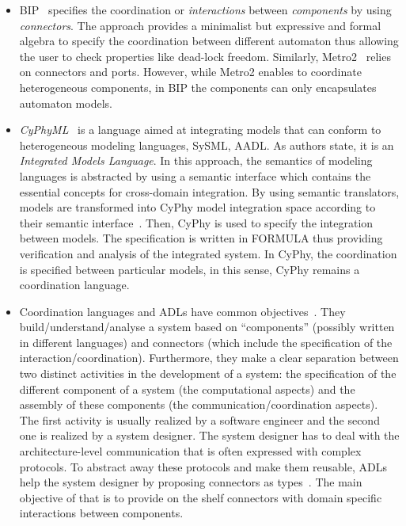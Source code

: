 \begin{itemize}
			
			\item BIP~\cite{bipbib} specifies the coordination or \emph{interactions} between \emph{components} by using \emph{connectors}. The approach provides a minimalist but expressive and formal algebra to specify the coordination between different automaton thus allowing the user to check properties like dead-lock freedom. Similarly, Metro2~\cite{metro2bib} relies on connectors and ports. However, while Metro2 enables to coordinate heterogeneous components, in BIP the components can only encapsulates automaton models. 
			 
			 
			\item \emph{CyPhyML}~\cite{semanicbackplane} is a language aimed at integrating models that can conform to heterogeneous modeling languages, \eg SySML, AADL. As authors state, it is an \emph{Integrated Models Language}. In this approach, the semantics of modeling languages is abstracted by using a semantic interface which contains the essential concepts for cross-domain integration. By using semantic translators, models are transformed into CyPhy model integration space according to their semantic interface~\cite{semanicbackplane}. Then, CyPhy is used to specify the integration between models. The specification is written in FORMULA thus providing verification and analysis of the integrated system. In CyPhy, the coordination is specified between particular models, in this sense, CyPhy remains a coordination language.
			 
			
			
			\item Coordination languages and ADLs have common objectives~\cite{coordmodels}. They build/understand/analyse a system based on ``components'' (possibly written in different languages) and connectors (which include the specification of the interaction/coordination). Furthermore, they make a clear separation between two distinct activities in the development of a system: the specification of the different component of a system (\ie the computational aspects) and the assembly of these components (\ie the communication/coordination aspects). The first activity is usually realized by a software engineer and the second one is realized by a system designer. The system designer has to deal with the architecture-level communication that is often expressed with complex protocols. To abstract away these protocols and make them reusable, ADLs help the system designer by proposing connectors as types~\cite{frameadlsbib}. The main objective of that is to provide on the shelf connectors with domain specific interactions between components. 
			

\end{itemize}
